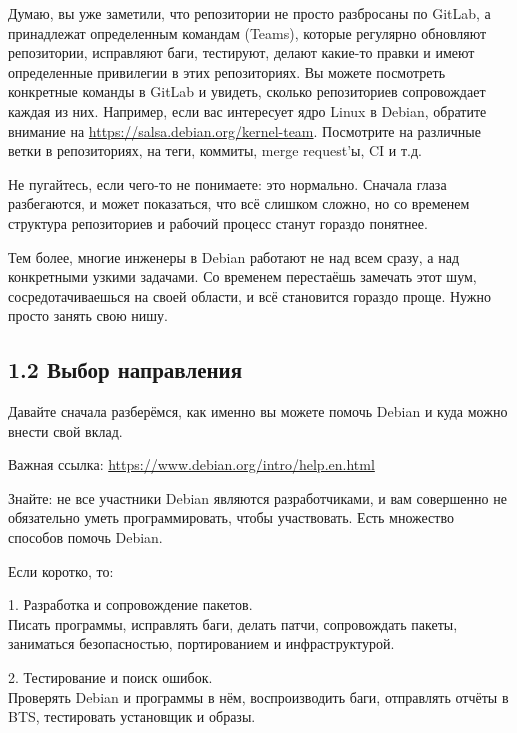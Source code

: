 Думаю, вы уже заметили, что репозитории не просто разбросаны по GitLab, а
принадлежат определенным командам (Teams), которые регулярно обновляют
репозитории, исправляют баги, тестируют, делают какие-то правки и имеют
определенные привилегии в этих репозиториях. Вы можете посмотреть конкретные
команды в GitLab и увидеть, сколько репозиториев сопровождает каждая из них.
Например, если вас интересует ядро Linux в Debian, обратите внимание на
\url{https://salsa.debian.org/kernel-team}. Посмотрите на различные ветки в
репозиториях, на теги, коммиты, merge request'ы, CI и т.д.

Не пугайтесь, если чего-то не понимаете: это нормально. Сначала глаза
разбегаются, и может показаться, что всё слишком сложно, но со временем
структура репозиториев и рабочий процесс станут гораздо понятнее.

Тем более, многие инженеры в Debian работают не над всем сразу, а над
конкретными узкими задачами. Со временем перестаёшь замечать этот шум,
сосредотачиваешься на своей области, и всё становится гораздо проще. Нужно
просто занять свою нишу.

\vspace{10cm}

\subsection*{\textbf{1.2 Выбор направления}}
\vspace{-0.5cm}

Давайте сначала разберёмся, как именно вы можете помочь Debian и куда можно
внести свой вклад.

Важная ссылка: \url{https://www.debian.org/intro/help.en.html}

Знайте: не все участники Debian являются разработчиками, и вам совершенно не
обязательно уметь программировать, чтобы участвовать. Есть множество способов
помочь Debian.

Если коротко, то:

1. Разработка и сопровождение пакетов.\\
   Писать программы, исправлять баги, делать патчи, сопровождать пакеты,
   заниматься безопасностью, портированием и инфраструктурой.

2. Тестирование и поиск ошибок.\\
   Проверять Debian и программы в нём, воспроизводить баги, отправлять отчёты в
   BTS, тестировать установщик и образы.

